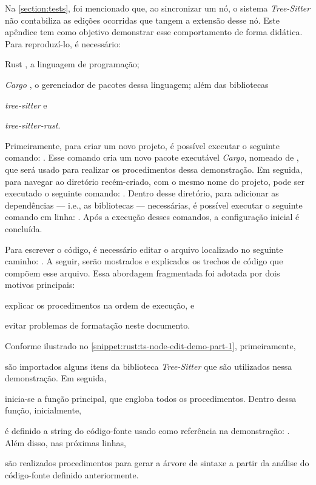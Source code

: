 \documentclass
  [11pt,a4paper,english,brazil,openright,sumario=tradicional,twoside]
  {abntex2}
\newcommand{\treesitter}{\textit{Tree-Sitter}\xspace}
\begin{document}
\begin{apendicesenv}
{{    Na \cref{section:tests}, foi mencionado que, ao sincronizar um nó, o
    sistema \treesitter não contabiliza as edições ocorridas que tangem a
    extensão desse nó. Este apêndice tem como objetivo demonstrar esse
    comportamento de forma didática. Para reproduzí-lo, é necessário:
    \begin{inparaenum}
      \item Rust \cite{rust-2023-rust}, a linguagem de programação;
      \item \textit{Cargo} \cite{rust-2023-cargo}, o gerenciador de pacotes
            dessa linguagem; além das bibliotecas
      \item \textit{tree-sitter} e
      \item \textit{tree-sitter-rust}.
    \end{inparaenum}

    Primeiramente, para criar um novo projeto, é possível executar o seguinte
    comando: . Esse comando cria
    um novo pacote executável \textit{Cargo}, nomeado de
    , que será usado para realizar os
    procedimentos dessa demonstração. Em seguida, para navegar ao diretório
    recém-criado, com o mesmo nome do projeto, pode ser executado o seguinte
    comando: . Dentro desse diretório,
    para adicionar as dependências --- i.e., as bibliotecas --- necessárias, é
    possível executar o seguinte comando em linha:
    . Após a execução
    desses comandos, a configuração inicial é concluída.

    Para escrever o código, é necessário editar o arquivo localizado no
    seguinte caminho: . A seguir, serão
    mostrados e explicados os trechos de código que compõem esse arquivo. Essa
    abordagem fragmentada foi adotada por dois motivos principais:
    \begin{inparaenum}
      \item explicar os procedimentos na ordem de execução, e
      \item evitar problemas de formatação neste documento.
    \end{inparaenum}

    Conforme ilustrado no \cref{snippet:rust:ts-node-edit-demo-part-1},
    primeiramente,
    \begin{inparaenum}
      \item são importados alguns itens da biblioteca \treesitter que são
            utilizados nessa demonstração. Em seguida,
      \item inicia-se a função principal, que engloba todos os procedimentos.
            Dentro dessa função, inicialmente,
      \item é definido a string do código-fonte usado como referência na
            demonstração: . Além disso,
            nas próximas linhas,
      \item são realizados procedimentos para gerar a árvore de sintaxe a
            partir da análise do código-fonte definido anteriormente.
    \end{inparaenum}

}}
\end{apendicesenv}
\end{document}
